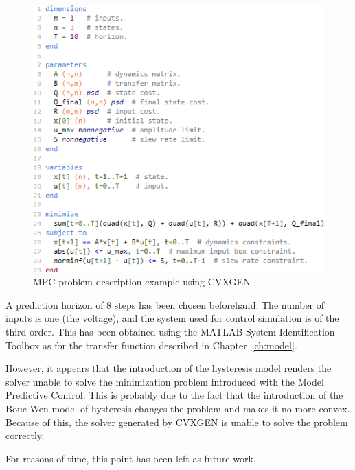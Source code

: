 \begin{figure}[H]
	\centering
	\includegraphics[width=0.8\linewidth]{Images/code_example}
	\caption{MPC problem description example using CVXGEN}
	\label{fig:code_example}
\end{figure}

A prediction horizon of 8 steps has been chosen beforehand. The number of inputs
is one (the voltage), and the system used for control simulation is of the third order.
This has been obtained using the MATLAB System Identification Toolbox 
as for the transfer function described in Chapter~\ref{ch:model}.

However, it appears that the introduction of the hysteresis model
renders the solver unable to solve the minimization problem introduced with
the Model Predictive Control. This is probably due to the fact that
the introduction of the Bouc-Wen model of hysteresis changes the problem
and makes it no more convex. Because of this, the solver generated
by CVXGEN is unable to solve the problem correctly.

For reasons of time, this point has been left as future work.







